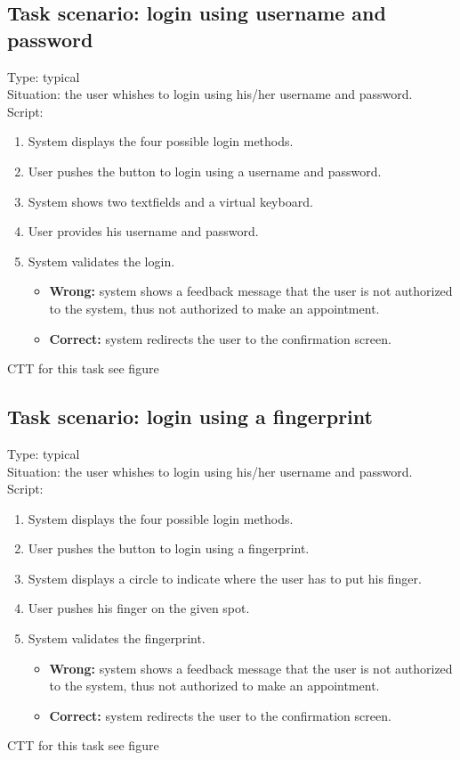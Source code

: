 \documentclass[11pt, a4paper,svglistings]{report}
\begin{document}
\subsection{Task scenario: login using username and password}

Type: typical \\
Situation: the user whishes to login using his/her username and password. \\
Script:
\begin{enumerate}
\item System displays the four possible login methods.
\item User pushes the button to login using a username and password.
\item System shows two textfields and a virtual keyboard.
\item User provides his username and password.
\item System validates the login.
\begin{itemize}
\item \textbf{Wrong:} system shows a feedback message that the user is not authorized to the system, thus not authorized to make an appointment.
\item \textbf{Correct:} system redirects the user to the  confirmation screen.
\end{itemize}
\end{enumerate}
CTT for this task see figure %

\subsection{Task scenario: login using a fingerprint}

Type: typical \\
Situation: the user whishes to login using his/her username and password. \\
Script:
\begin{enumerate}
\item System displays the four possible login methods.
\item User pushes the button to login using a fingerprint.
\item System displays a circle to indicate where the user has to put his finger.
\item User pushes his finger on the given spot.
\item System validates the fingerprint.
\begin{itemize}
\item \textbf{Wrong:} system shows a feedback message that the user is not authorized to the system, thus not authorized to make an appointment.
\item \textbf{Correct:} system redirects the user to the  confirmation screen.
\end{itemize}
\end{enumerate}
CTT for this task see figure %
\end{document}
